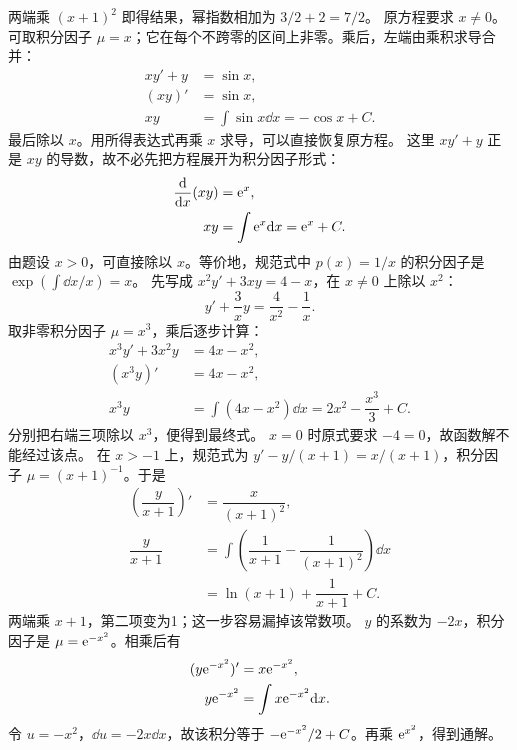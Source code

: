 两端乘 $(x+1)^2$ 即得结果，幂指数相加为 $3/2+2=7/2$。
原方程要求 $x\ne0$。可取积分因子 $\mu=x$；它在每个不跨零的区间上非零。乘后，左端由乘积求导合并：
\[
\begin{aligned}
xy'+y&=\sin x,\\
(xy)'&=\sin x,\\
xy&=\int\sin x\dd x=-\cos x+C.
\end{aligned}
\]
最后除以 $x$。用所得表达式再乘 $x$ 求导，可以直接恢复原方程。
这里 $xy'+y$ 正是 $xy$ 的导数，故不必先把方程展开为积分因子形式：
\[
\begin{aligned}
\dfrac{\mathrm d}{\mathrm d x}(xy)&=\mathrm e^x,\\
xy&=\int\mathrm e^x\mathrm d x=\mathrm e^x+C.
\end{aligned}
\]
由题设 $x>0$，可直接除以 $x$。等价地，规范式中 $p(x)=1/x$ 的积分因子是 $\displaystyle \exp(\int\dd x/x)=x$。
先写成 $x^2y'+3xy=4-x$，在 $x\ne0$ 上除以 $x^2$：
\[
y'+\dfrac3xy=\dfrac4{x^2}-\dfrac1x.
\]
取非零积分因子 $\mu=x^3$，乘后逐步计算：
\[
\begin{aligned}
x^3y'+3x^2y&=4x-x^2,\\
(x^3y)'&=4x-x^2,\\
x^3y&=\int(4x-x^2)\dd x=2x^2-\dfrac{x^3}{3}+C.
\end{aligned}
\]
分别把右端三项除以 $x^3$，便得到最终式。
$x=0$ 时原式要求 $-4=0$，故函数解不能经过该点。
在 $x>-1$ 上，规范式为 $y'-y/(x+1)=x/(x+1)$，积分因子 $\mu=(x+1)^{-1}$。于是
\[
\begin{aligned}
\left(\dfrac y{x+1}\right)'&=\dfrac x{(x+1)^2},\\
\dfrac y{x+1}
 &=\int\left(\dfrac1{x+1}-\dfrac1{(x+1)^2}\right)\dd x\\
 &=\ln(x+1)+\dfrac1{x+1}+C.
\end{aligned}
\]
两端乘 $x+1$，第二项变为1；这一步容易漏掉该常数项。
$y$ 的系数为 $-2x$，积分因子是 $\mu=\mathrm e^{-x^2}$。相乘后有
\[
\begin{aligned}
(y\mathrm e^{-x^2})'&=x\mathrm e^{-x^2},\\
y\mathrm e^{-x^2}&=\int x\mathrm e^{-x^2}\mathrm d x.
\end{aligned}
\]
令 $u=-x^2$，$\dd u=-2x\dd x$，故该积分等于 $-\mathrm e^{-x^2}/2+C$。再乘 $\mathrm e^{x^2}$，得到通解。
